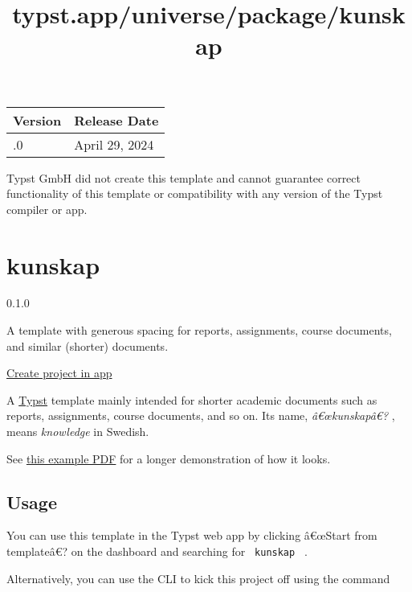 \begin{longtable}[]{@{}ll@{}}
\toprule\noalign{}
Version & Release Date \\
\midrule\noalign{}
\endhead
\bottomrule\noalign{}
\endlastfoot
0.1.0 & April 29, 2024 \\
\end{longtable}

Typst GmbH did not create this template and cannot guarantee correct
functionality of this template or compatibility with any version of the
Typst compiler or app.


\title{typst.app/universe/package/kunskap}

\label{banner}
\label{template-thumbnail}

\section{kunskap}\label{kunskap}

{ 0.1.0 }

A template with generous spacing for reports, assignments, course
documents, and similar (shorter) documents.

\href{/app?template=kunskap&version=0.1.0}{Create project in app}

\label{readme}
A \href{https://typst.app/}{Typst} template mainly intended for shorter
academic documents such as reports, assignments, course documents, and
so on. Its name, \emph{â€œkunskapâ€?} , means \emph{knowledge} in
Swedish.

See
\href{https://github.com/mbollmann/typst-kunskap/blob/main/example.pdf}{this
example PDF} for a longer demonstration of how it looks.

\subsection{Usage}\label{usage}

You can use this template in the Typst web app by clicking â€œStart from
templateâ€? on the dashboard and searching for \texttt{\ kunskap\ } .

Alternatively, you can use the CLI to kick this project off using the
command

\begin{Shaded}
\begin{Highlighting}[]
\end{Highlighting}
\end{Shaded}

